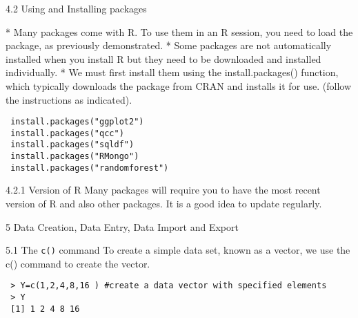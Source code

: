  
{4.2 Using and Installing packages}
 
 *  Many packages come with R. To use them in an R session, you need to load the package, as
 previously demonstrated.
 *  Some packages are not automatically installed when you install R but they need to be downloaded
 and installed individually. 
 *  We must first install them using the install.packages()
 function, which typically downloads the package from CRAN and installs it for use. (follow the
 instructions as indicated).

 
 
 \begin{framed}
 \begin{verbatim}
 install.packages("ggplot2")
 install.packages("qcc")
 install.packages("sqldf")
 install.packages("RMongo")
 install.packages("randomforest")
 \end{verbatim}
 \end{framed}
 
 
 
{4.2.1 Version of R}
 Many packages will require you to have the most recent version of R and also other packages.
 It is a good idea to update regularly.
 
 
 5 Data Creation, Data Entry, Data Import and Export
 
 
{5.1 The \texttt{c()} command}
 To create a simple data set, known as a vector, we use the c() command to create the vector.
 \begin{framed}
 \begin{verbatim}
 > Y=c(1,2,4,8,16 ) #create a data vector with specified elements
 > Y
 [1] 1 2 4 8 16
 
 \end{verbatim}
 \end{framed}
 
 
 
